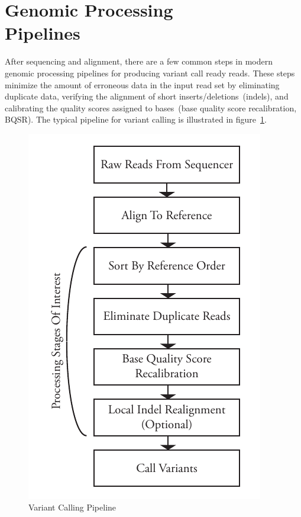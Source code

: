 \documentclass[10pt,twocolumn]{article}
\begin{document}
\section{Genomic Processing\\Pipelines}
\label{sec:genomic-processing-pipelines}

After sequencing and alignment, there are a few common steps in modern genomic processing pipelines for producing
variant call ready reads. These steps minimize the amount of erroneous data in the input read set by eliminating duplicate data,
verifying the alignment of short inserts/deletions~(indels), and calibrating the quality scores assigned to bases~(base quality score
recalibration, BQSR). The typical pipeline for variant calling is illustrated in figure~\ref{fig:pipeline}.

\begin{figure}[h]
\begin{center}
\includegraphics[width=0.9\linewidth]{pipeline.pdf}
\end{center}
\caption{Variant Calling Pipeline}
\label{fig:pipeline}
\end{figure}
\end{document}
